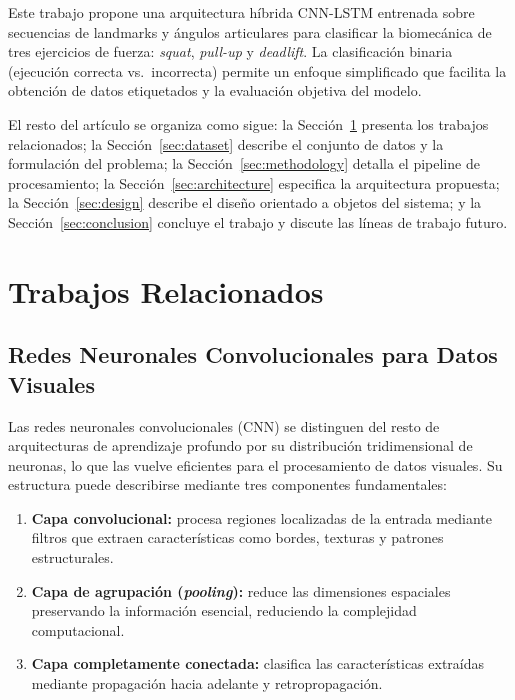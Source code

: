 \documentclass[conference]{IEEEtran}
\begin{document}
Este trabajo propone una arquitectura híbrida CNN-LSTM entrenada
sobre secuencias de landmarks y ángulos articulares para clasificar
la biomecánica de tres ejercicios de fuerza: \textit{squat},
\textit{pull-up} y \textit{deadlift}. La clasificación binaria
(ejecución correcta vs.\ incorrecta) permite un enfoque simplificado
que facilita la obtención de datos etiquetados y la evaluación
objetiva del modelo.

El resto del artículo se organiza como sigue: la
Sección~\ref{sec:related} presenta los trabajos relacionados;
la Sección~\ref{sec:dataset} describe el conjunto de datos y la
formulación del problema; la Sección~\ref{sec:methodology} detalla
el pipeline de procesamiento; la Sección~\ref{sec:architecture}
especifica la arquitectura propuesta; la
Sección~\ref{sec:design} describe el diseño orientado a objetos
del sistema; y la Sección~\ref{sec:conclusion} concluye el trabajo
y discute las líneas de trabajo futuro.

\section{Trabajos Relacionados}
\label{sec:related}

\subsection{Redes Neuronales Convolucionales para Datos Visuales}

Las redes neuronales convolucionales (CNN) se distinguen del resto
de arquitecturas de aprendizaje profundo por su distribución
tridimensional de neuronas, lo que las vuelve eficientes para el
procesamiento de datos visuales. Su estructura puede describirse
mediante tres componentes fundamentales:

\begin{enumerate}
  \item \textbf{Capa convolucional:} procesa regiones localizadas
        de la entrada mediante filtros que extraen características
        como bordes, texturas y patrones estructurales.
  \item \textbf{Capa de agrupación (\textit{pooling}):} reduce las
        dimensiones espaciales preservando la información esencial,
        reduciendo la complejidad computacional.
  \item \textbf{Capa completamente conectada:} clasifica las
        características extraídas mediante propagación hacia
        adelante y retropropagación.
\end{enumerate}
\end{document}
